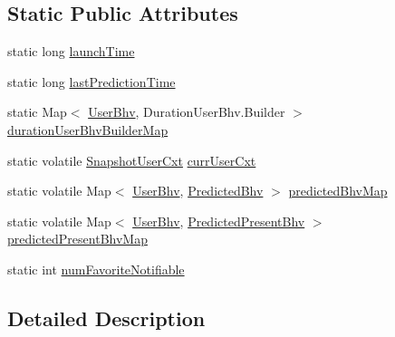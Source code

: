 \subsection*{\-Static \-Public \-Attributes}
\begin{DoxyCompactItemize}
\item 
static long \hyperlink{classlab_1_1davidahn_1_1appshuttle_1_1_app_shuttle_application_a1f29797a601b4c214b90cd0952595564}{launch\-Time}
\item 
static long \hyperlink{classlab_1_1davidahn_1_1appshuttle_1_1_app_shuttle_application_adb0cb74b77e1bf2dd00d8d11308a0b19}{last\-Prediction\-Time}
\item 
static \-Map$<$ \hyperlink{interfacelab_1_1davidahn_1_1appshuttle_1_1collect_1_1bhv_1_1_user_bhv}{\-User\-Bhv}, \*
\-Duration\-User\-Bhv.\-Builder $>$ \hyperlink{classlab_1_1davidahn_1_1appshuttle_1_1_app_shuttle_application_a42e05ff1c1e85fe0d8178d5f6db08c8d}{duration\-User\-Bhv\-Builder\-Map}
\item 
static volatile \hyperlink{classlab_1_1davidahn_1_1appshuttle_1_1collect_1_1_snapshot_user_cxt}{\-Snapshot\-User\-Cxt} \hyperlink{classlab_1_1davidahn_1_1appshuttle_1_1_app_shuttle_application_abad87ce8605d542e59bb402ceaff671f}{curr\-User\-Cxt}
\item 
static volatile \-Map$<$ \hyperlink{interfacelab_1_1davidahn_1_1appshuttle_1_1collect_1_1bhv_1_1_user_bhv}{\-User\-Bhv}, \*
\hyperlink{classlab_1_1davidahn_1_1appshuttle_1_1predict_1_1_predicted_bhv}{\-Predicted\-Bhv} $>$ \hyperlink{classlab_1_1davidahn_1_1appshuttle_1_1_app_shuttle_application_a3a70bde7b271c3e7d4aaf83df91d4b41}{predicted\-Bhv\-Map}
\item 
static volatile \-Map$<$ \hyperlink{interfacelab_1_1davidahn_1_1appshuttle_1_1collect_1_1bhv_1_1_user_bhv}{\-User\-Bhv}, \*
\hyperlink{classlab_1_1davidahn_1_1appshuttle_1_1view_1_1_predicted_present_bhv}{\-Predicted\-Present\-Bhv} $>$ \hyperlink{classlab_1_1davidahn_1_1appshuttle_1_1_app_shuttle_application_aae8fb9f870346c2665884100497a83cf}{predicted\-Present\-Bhv\-Map}
\item 
static int \hyperlink{classlab_1_1davidahn_1_1appshuttle_1_1_app_shuttle_application_a0df5e1b7e8ec958c2c6d8811921cb54c}{num\-Favorite\-Notifiable}
\end{DoxyCompactItemize}


\subsection{\-Detailed \-Description}


